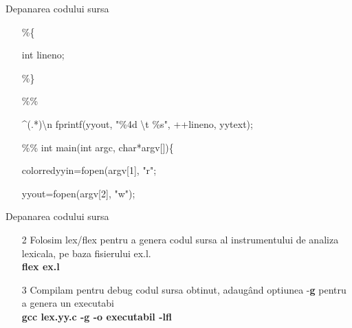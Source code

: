 \documentclass[pdf]{beamer}
\begin{document}
\begin{frame}{Depanarea codului sursa}
\begin{itemize}
\item[]
\%\{
\item[]
int lineno;
\item[]
\%\}
\item[]
\%\%
\item[]
\^{}(.*)\textbackslash n fprintf(yyout, "\%4d \textbackslash t \%s", ++lineno, yytext);
\item[]
\%\%
\newline
int main(int argc, char*argv[])\{
\item[]
color{red}{yyin=fopen(argv[1], "r"};
\item[]
yyout=fopen(argv[2], "w");
\item[]
\item[]
\item[]
\item[]
\color{black}{\}}

\end{itemize}
\end{frame}



\begin{frame}{Depanarea codului sursa}
\begin{itemize}
\item[2]
Folosim lex/flex pentru a genera codul sursa al instrumentului de analiza lexicala, pe baza fisierului ex.l.    \\
\hspace{10mm} \textbf{flex ex.l}
\item[3]
Compilam pentru debug codul sursa obtinut, adaugând optiunea -\textbf{g} pentru a genera un executabi\\
\hspace{10mm} \textbf{gcc lex.yy.c -g -o executabil -lfl}

\end{itemize}
\end{frame}
\end{document}
